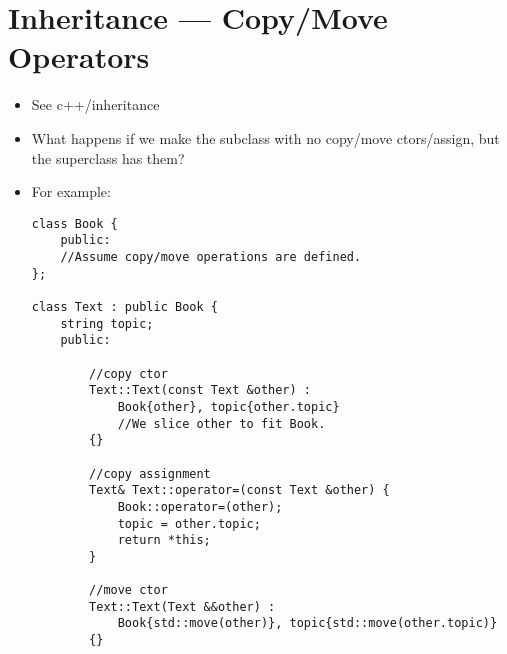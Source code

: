 \documentclass{article}
\begin{document}
\section{Inheritance --- Copy/Move Operators}
\begin{itemize}
\item See c++/inheritance
\item What happens if we make the subclass with no copy/move ctors/assign, but the superclass has them?
\item For example:
\begin{lstlisting}
class Book {
    public:
    //Assume copy/move operations are defined.
};

class Text : public Book {
    string topic;
    public:

        //copy ctor
        Text::Text(const Text &other) :
            Book{other}, topic{other.topic}
            //We slice other to fit Book.
        {}

        //copy assignment
        Text& Text::operator=(const Text &other) {
            Book::operator=(other);
            topic = other.topic;
            return *this;
        }

        //move ctor
        Text::Text(Text &&other) :
            Book{std::move(other)}, topic{std::move(other.topic)}
        {}


\end{lstlisting}
\end{itemize}
\end{document}
